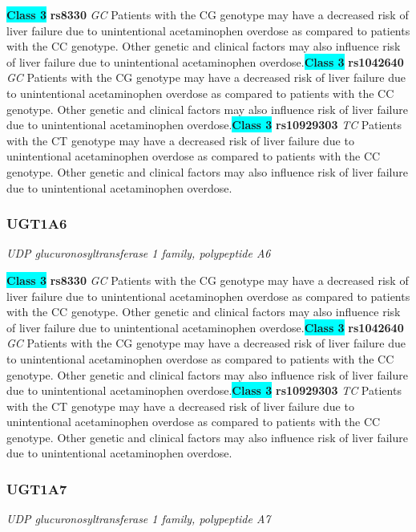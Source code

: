 \documentclass{report}
\begin{document}
\textbf{\colorbox{cyan} {Class 3}} \textbf{ rs8330 } \textit{ GC }
Patients with the CG genotype may have a decreased risk of liver failure due to unintentional acetaminophen overdose as compared to patients with the CC genotype. Other genetic and clinical factors may also influence risk of liver failure due to unintentional acetaminophen overdose.\newline\textbf{\colorbox{cyan} {Class 3}} \textbf{ rs1042640 } \textit{ GC }
Patients with the CG genotype may have a decreased risk of liver failure due to unintentional acetaminophen overdose as compared to patients with the CC genotype. Other genetic and clinical factors may also influence risk of liver failure due to unintentional acetaminophen overdose.\newline\textbf{\colorbox{cyan} {Class 3}} \textbf{ rs10929303 } \textit{ TC }
Patients with the CT genotype may have a decreased risk of liver failure due to unintentional acetaminophen overdose as compared to patients with the CC genotype. Other genetic and clinical factors may also influence risk of liver failure due to unintentional acetaminophen overdose.\newline\subsubsection{ UGT1A6 }
\textit{ UDP glucuronosyltransferase 1 family, polypeptide A6 }

\textbf{\colorbox{cyan} {Class 3}} \textbf{ rs8330 } \textit{ GC }
Patients with the CG genotype may have a decreased risk of liver failure due to unintentional acetaminophen overdose as compared to patients with the CC genotype. Other genetic and clinical factors may also influence risk of liver failure due to unintentional acetaminophen overdose.\newline\textbf{\colorbox{cyan} {Class 3}} \textbf{ rs1042640 } \textit{ GC }
Patients with the CG genotype may have a decreased risk of liver failure due to unintentional acetaminophen overdose as compared to patients with the CC genotype. Other genetic and clinical factors may also influence risk of liver failure due to unintentional acetaminophen overdose.\newline\textbf{\colorbox{cyan} {Class 3}} \textbf{ rs10929303 } \textit{ TC }
Patients with the CT genotype may have a decreased risk of liver failure due to unintentional acetaminophen overdose as compared to patients with the CC genotype. Other genetic and clinical factors may also influence risk of liver failure due to unintentional acetaminophen overdose.\newline\subsubsection{ UGT1A7 }
\textit{ UDP glucuronosyltransferase 1 family, polypeptide A7 }
\end{document}
